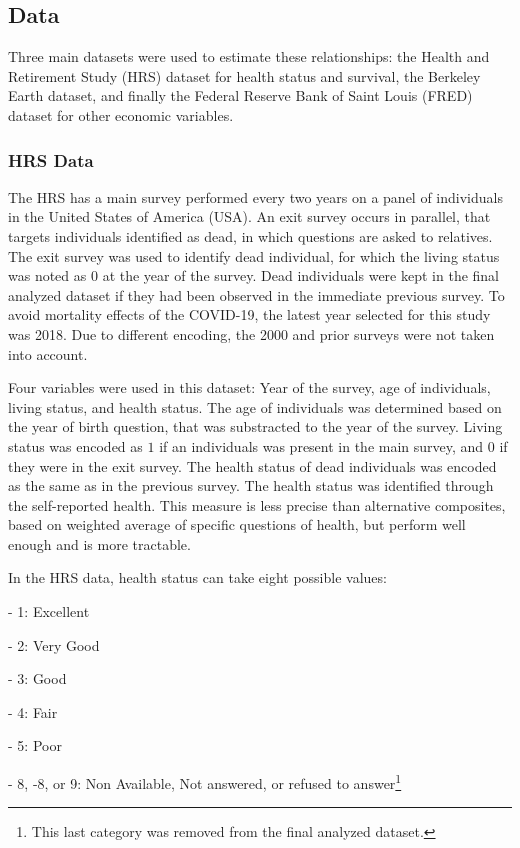 \documentclass{article}
\begin{document}
\subsection{Data}

Three main datasets were used to estimate these relationships: 
the Health and Retirement Study (HRS) dataset for
health status and survival,
the Berkeley Earth dataset,
and finally the Federal Reserve Bank of Saint Louis (FRED) dataset for 
other economic variables.

\subsubsection{HRS Data}

The HRS has a main survey performed every two years on a panel of individuals in the United States of America (USA). 
An exit survey occurs in parallel, that targets individuals identified as dead, in which questions are asked to relatives.
The exit survey was used to identify dead individual, for which the living status was noted as $0$ at the year of the survey. 
Dead individuals were kept in the final analyzed dataset if they had been observed in the immediate previous survey. 
To avoid mortality effects of the COVID-19, the latest year selected for this study was 2018.
Due to different encoding, the 2000 and prior surveys were not taken into account. 

Four variables were used in this dataset: Year of the survey, age of individuals, living status, and health status.
The age of individuals was determined based on the year of birth question, that was substracted to the year of the survey. 
Living status was encoded as $1$ if an individuals was present in the main survey, and $0$ if they were in the exit survey.
The health status of dead individuals was encoded as the same as in the previous survey. 
The health status was identified through the self-reported health.
This measure is less precise than alternative composites, based on weighted average of specific questions of health, 
but perform well enough and is more tractable.

In the HRS data, health status can take eight possible values: 


- 1: Excellent

- 2: Very Good

- 3: Good

- 4: Fair

- 5: Poor

- 8, -8, or 9: Non Available, Not answered, or refused to answer\footnote{This last category was removed from the final analyzed dataset.}\\
\end{document}
